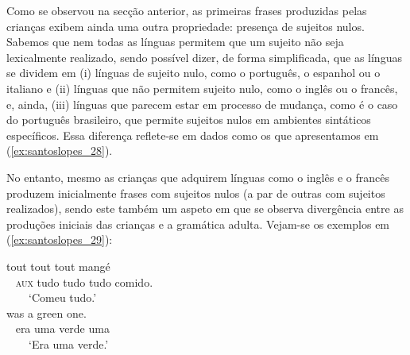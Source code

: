 \documentclass[output=paper]{LSP/langsci}
\begin{document}
Como se observou na secção anterior, as primeiras frases produzidas pelas crianças exibem ainda uma outra propriedade: presença de sujeitos nulos. Sabemos que nem todas as línguas permitem que um sujeito não seja lexicalmente realizado, sendo possível dizer, de forma simplificada, que as línguas se dividem em (i) línguas de sujeito nulo, como o português, o espanhol ou o italiano e (ii) línguas que não permitem sujeito nulo, como o inglês ou o francês, e, ainda, (iii) línguas que parecem estar em processo de mudança, como é o caso do português brasileiro, que permite sujeitos nulos em ambientes sintáticos específicos. Essa diferença reflete-se em dados como os que apresentamos em (\ref{ex:santoslopes_28}).

\ea\label{ex:santoslopes_28}
\zl

No entanto, mesmo as crianças que adquirem línguas como o inglês e o francês produzem inicialmente frases com sujeitos nulos (a par de outras com sujeitos realizados), sendo este também um aspeto em que se observa divergência entre as produções iniciais das crianças e a gramática adulta. Vejam-se os exemplos em (\ref{ex:santoslopes_29}):

\ea\label{ex:santoslopes_29}
\ea\label{ex:santoslopes_29a}
\gll \underline{\hspace{1em}} tout tout tout mangé\\
~ \textsc{aux} tudo tudo tudo comido.\\
\glt ~~~~`Comeu tudo.'\\
\ex\label{ex:santoslopes_29b}
\gll \underline{\hspace{1em}} was a green one.\\
~ era uma verde uma\\
\glt ~~~~`Era uma verde.'
\zl 
\end{document}
